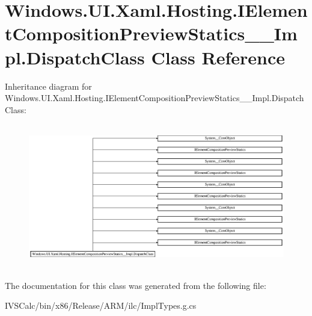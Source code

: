 \hypertarget{class_windows_1_1_u_i_1_1_xaml_1_1_hosting_1_1_i_element_composition_preview_statics_____impl_1_1_dispatch_class}{}\section{Windows.\+U\+I.\+Xaml.\+Hosting.\+I\+Element\+Composition\+Preview\+Statics\+\_\+\+\_\+\+Impl.\+Dispatch\+Class Class Reference}
\label{class_windows_1_1_u_i_1_1_xaml_1_1_hosting_1_1_i_element_composition_preview_statics_____impl_1_1_dispatch_class}
Inheritance diagram for Windows.\+U\+I.\+Xaml.\+Hosting.\+I\+Element\+Composition\+Preview\+Statics\+\_\+\+\_\+\+Impl.\+Dispatch\+Class\+:\begin{figure}[H]
\begin{center}
\leavevmode
\includegraphics[height=6.350515cm]{class_windows_1_1_u_i_1_1_xaml_1_1_hosting_1_1_i_element_composition_preview_statics_____impl_1_1_dispatch_class}
\end{center}
\end{figure}


The documentation for this class was generated from the following file\+:\begin{DoxyCompactItemize}
\item 
I\+V\+S\+Calc/bin/x86/\+Release/\+A\+R\+M/ilc/Impl\+Types.\+g.\+cs\end{DoxyCompactItemize}
